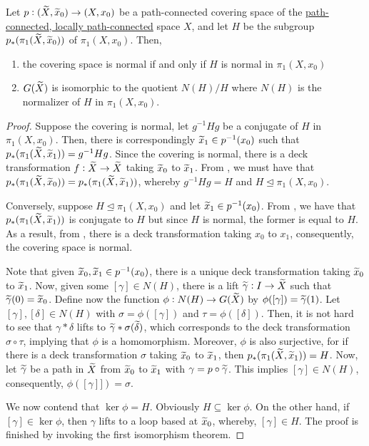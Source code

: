 \begin{theorem}
    Let $p: (\widetilde{X},\widetilde{x}_0)\to(X,x_0)$ be a path-connected covering space of the \ul{path-connected, locally path-connected} space $X$, and let $H$ be the subgroup $p_*(\pi_1(\widetilde{X},\widetilde{x}_0))$ of $\pi_1(X,x_0)$. Then, 
    \begin{enumerate}[label=(\alph*)]
        \item the covering space is normal if and only if $H$ is normal in $\pi_1(X,x_0)$ 
        \item $G(\widetilde{X})$ is isomorphic to the quotient $N(H)/H$ where $N(H)$ is the normalizer of $H$ in $\pi_1(X,x_0)$.
    \end{enumerate}
\end{theorem}
\begin{proof}
    Suppose the covering is normal, let $g^{-1}Hg$ be a conjugate of $H$ in $\pi_1(X,x_0)$. Then, there is correspondingly $\widetilde{x}_1\in p^{-1}(x_0)$ such that $p_*(\pi_1(\widetilde{X},\widetilde{x}_1)) = g^{-1}Hg$. Since the covering is normal, there is a deck transformation $f:\widetilde{X}\to\widetilde{X}$ taking $\widetilde{x}_0$ to $\widetilde{x}_1$. From , we must have that $p_*(\pi_1(\widetilde{X},\widetilde{x}_0)) = p_*(\pi_1(\widetilde{X},\widetilde{x}_1))$, whereby $g^{-1}Hg = H$ and $H\unlhd\pi_1(X,x_0)$.

    Conversely, suppose $H\unlhd\pi_1(X,x_0)$ and let $\widetilde{x}_1\in p^{-1}(x_0)$. From , we have that $p_*(\pi_1(\widetilde{X},\widetilde{x}_1))$ is conjugate to $H$ but since $H$ is normal, the former is equal to $H$. As a result, from , there is a deck transformation taking $x_0$ to $x_1$, consequently, the covering space is normal.

    Note that given $\widetilde{x}_0,\widetilde{x}_1\in p^{-1}(x_0)$, there is a unique deck transformation taking $\widetilde{x}_0$ to $\widetilde{x}_1$. Now, given some $[\gamma]\in N(H)$, there is a lift $\widetilde{\gamma}: I\to\widetilde{X}$ such that $\widetilde{\gamma}(0) = \widetilde{x}_0$. Define now the function $\phi: N(H)\to G(\widetilde{X})$ by $\phi([\gamma]) = \widetilde{\gamma}(1)$. Let $[\gamma],[\delta]\in N(H)$ with $\sigma = \phi([\gamma])$ and $\tau = \phi([\delta])$. Then, it is not hard to see that $\gamma * \delta$ lifts to $\widetilde{\gamma} * \sigma(\widetilde{\delta})$, which corresponds to the deck transformation $\sigma\circ\tau$, implying that $\phi$ is a homomorphism. Moreover, $\phi$ is also surjective, for if there is a deck transformation $\sigma$ taking $\widetilde{x}_0$ to $\widetilde{x}_1$, then $p_*(\pi_1(\widetilde{X},\widetilde{x}_1)) = H$. Now, let $\widetilde{\gamma}$ be a path in $\widetilde{X}$ from $\widetilde{x}_0$ to $\widetilde{x}_1$ with $\gamma = p\circ\widetilde{\gamma}$. This implies $[\gamma]\in N(H)$, consequently, $\phi([\gamma]]) = \sigma$.

    We now contend that $\ker\phi = H$. Obviously $H\subseteq\ker\phi$. On the other hand, if $[\gamma]\in\ker\phi$, then $\gamma$ lifts to a loop based at $\widetilde{x}_0$, whereby, $[\gamma]\in H$. The proof is finished by invoking the first isomorphism theorem.
\end{proof}

